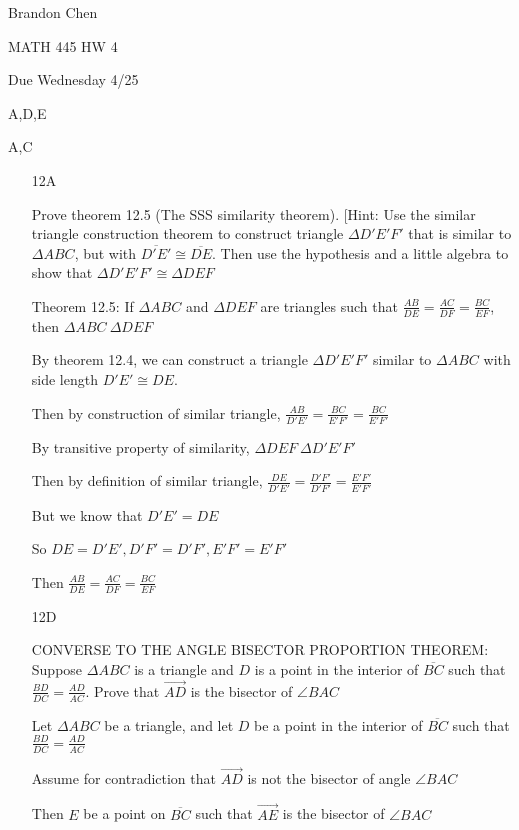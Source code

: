 \documentclass[11pt]{article}
\newcommand{\ray}[1]{\overrightarrow{#1}}
\newcommand{\segment}[1]{\overline{#1}}
\begin{document}
\noindent Brandon Chen

\noindent MATH 445 HW 4

\noindent Due Wednesday 4/25

 A,D,E

 A,C

\begin{itemize}

	\item[12A]

		Prove theorem 12.5 (The SSS similarity theorem). [Hint: Use the similar triangle construction theorem to construct triangle $\Delta D'E'F'$ that is similar to $\Delta ABC$, but with $\segment{D'E'} \cong \segment{DE}$. Then use the hypothesis and a little algebra to show that $\Delta D'E'F' \cong \Delta DEF$

	Theorem 12.5: If $\Delta ABC$ and $\Delta DEF$ are triangles such that $\frac{AB}{DE} = \frac{AC}{DF} = \frac{BC}{EF}$, then $\Delta ABC ~ \Delta DEF$

	By theorem 12.4, we can construct a triangle $\Delta D'E'F'$ similar to $\Delta ABC$ with side length $D'E' \cong DE$. 

	Then by construction of similar triangle, $\frac{AB}{D'E'} = \frac{BC}{E'F'} = \frac{BC}{E'F'}$

	By transitive property of similarity, $\Delta DEF ~ \Delta D'E'F'$

	Then by definition of similar triangle, $\frac{DE}{D'E'} = \frac{D'F'}{D'F'} = \frac{E'F'}{E'F'}$

	But we know that $D'E' = DE$

	So $DE = D'E', D'F' = D'F', E'F' = E'F'$

	Then $\frac{AB}{DE} = \frac{AC}{DF} = \frac{BC}{EF}$

	\item[12D]

		CONVERSE TO THE ANGLE BISECTOR PROPORTION THEOREM: Suppose $\Delta ABC$ is a triangle and $D$ is a point in the interior of $\segment{BC}$ such that $\frac{BD}{DC} = \frac{AD}{AC}$. Prove that $\ray{AD}$ is the bisector of $\angle BAC$

		Let $\Delta ABC$ be a triangle, and let $D$ be a point in the interior of $\segment{BC}$ such that $\frac{BD}{DC} = \frac{AD}{AC}$

		Assume for contradiction that $\ray{AD}$ is not the bisector of angle $\angle{BAC}$

		Then $E$ be a point on $\segment{BC}$ such that $\ray{AE}$ is the bisector of $\angle{BAC}$


\end{itemize}
\end{document}
